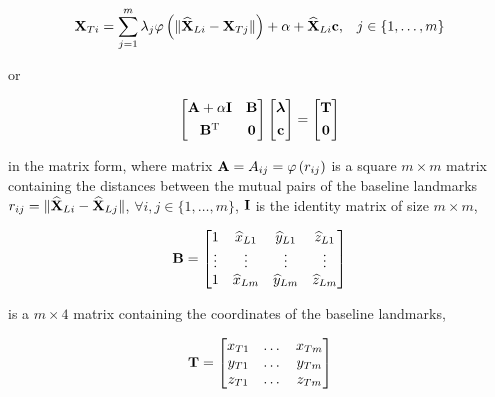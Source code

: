 \begin{equation}
{\bf X}_{Ti}=\sum\limits_{j=1}^m\lambda_j\varphi\left(\|\widehat{\bf X}_{Li}-{\bf X}_{Tj}\|\right)+\alpha+\widehat{\bf X}_{Li}{\bf c}\mbox{,}\quad j\in\{1,\dots,m\}
\end{equation}

or

\begin{equation}
\label{RBF}
\left[\begin{matrix}
{\bf A}+\alpha{\bf I} & {\bf B}\\[1ex]
{\bf B}^{\mathrm{T}} & {\bf 0}
\end{matrix}\right]
\left[\begin{matrix}
\bm\lambda\\[1ex]
{\bf c}
\end{matrix}\right]=
\left[\begin{matrix}
{\bf T}\\[1ex]
{\bf 0}
\end{matrix}\right]
\end{equation}

in the matrix form, where matrix ${\bf A}=A_{ij}=\varphi\left(r_{ij}\right)$ is a square $m\times m$ matrix containing the distances between the mutual pairs of the baseline landmarks $r_{ij}=\|\widehat{\bf X}_{Li}-\widehat{\bf X}_{Lj}\|$, $\forall i,j\in\{1,\dots,m\}$, ${\bf I}$ is the identity matrix of size $m\times m$,

\begin{equation}
{\bf B}=\left[\begin{matrix}
1 & \widehat{x}_{L1} & \widehat{y}_{L1} & \widehat{z}_{L1}\\
\vdots & \vdots & \vdots & \vdots\\
1 & \widehat{x}_{Lm} & \widehat{y}_{Lm} & \widehat{z}_{Lm}
\end{matrix}\right]
\end{equation}

is a $m\times 4$ matrix containing the coordinates of the baseline landmarks, 

\begin{equation}
{\bf T}=\left[\begin{matrix}
{x}_{T1} & \dots & {x}_{Tm} \\
{y}_{T1} & \dots & {y}_{Tm} \\
{z}_{T1} & \dots & {z}_{Tm}
\end{matrix}\right]
\end{equation}

